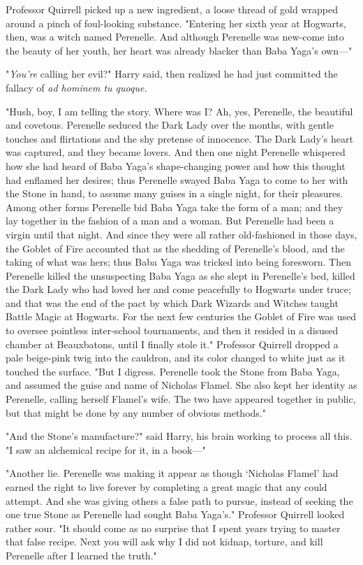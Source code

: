 Professor Quirrell picked up a new ingredient, a loose thread of gold wrapped 
around a pinch of foul-looking substance. "Entering her sixth year at Hogwarts, 
then, was a witch named Perenelle. And although Perenelle was new-come into the 
beauty of her youth, her heart was already blacker than Baba Yaga's own---"

"\emph{You're} calling her evil?" Harry said, then realized he had just 
committed the fallacy of \emph{ad hominem tu quoque.}

"Hush, boy, I am telling the story. Where was I? Ah, yes, Perenelle, the 
beautiful and covetous. Perenelle seduced the Dark Lady over the months, with 
gentle touches and flirtations and the shy pretense of innocence. The Dark 
Lady's heart was captured, and they became lovers. And then one night Perenelle 
whispered how she had heard of Baba Yaga's shape-changing power and how this 
thought had enflamed her desires; thus Perenelle swayed Baba Yaga to come to 
her with the Stone in hand, to assume many guises in a single night, for their 
pleasures. Among other forms Perenelle bid Baba Yaga take the form of a man; 
and they lay together in the fashion of a man and a woman. But Perenelle had 
been a virgin until that night. And since they were all rather old-fashioned in 
those days, the Goblet of Fire accounted that as the shedding of Perenelle's 
blood, and the taking of what was hers; thus Baba Yaga was tricked into being 
foresworn. Then Perenelle killed the unsuspecting Baba Yaga as she slept in 
Perenelle's bed, killed the Dark Lady who had loved her and come peacefully to 
Hogwarts under truce; and that was the end of the pact by which Dark Wizards 
and Witches taught Battle Magic at Hogwarts. For the next few centuries the 
Goblet of Fire was used to oversee pointless inter-school tournaments, and then 
it resided in a disused chamber at Beauxbatons, until I finally stole it." 
Professor Quirrell dropped a pale beige-pink twig into the cauldron, and its 
color changed to white just as it touched the surface. "But I digress. 
Perenelle took the Stone from Baba Yaga, and assumed the guise and name of 
Nicholas Flamel. She also kept her identity as Perenelle, calling herself 
Flamel's wife. The two have appeared together in public, but that might be done 
by any number of obvious methods."

"And the Stone's manufacture?" said Harry, his brain working to process all 
this. "I saw an alchemical recipe for it, in a book---"

"Another lie. Perenelle was making it appear as though `Nicholas Flamel' had 
earned the right to live forever by completing a great magic that any could 
attempt. And she was giving others a false path to pursue, instead of seeking 
the one true Stone as Perenelle had sought Baba Yaga's." Professor Quirrell 
looked rather sour. "It should come as no surprise that I spent years trying to 
master that false recipe. Next you will ask why I did not kidnap, torture, and 
kill Perenelle after I learned the truth."

